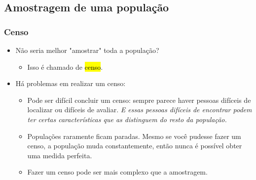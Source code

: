 \subsection{Amostragem de uma população}

\begin{frame}
\frametitle{Censo}

\begin{itemize}

\item Não seria melhor "amostrar" toda a população?

\begin{itemize}
\item Isso é chamado de \hl{censo}.
\end{itemize}

\pause

\item Há problemas em realizar um censo:

\begin{itemize}
\justifying
\item Pode ser difícil concluir um censo: sempre parece haver pessoas difíceis de localizar ou difíceis de avaliar. \textit{E essas pessoas difíceis de encontrar podem ter certas características que as distinguem do resto da população.}

\justifying
\item Populações raramente ficam paradas. Mesmo se você pudesse fazer um censo, a população muda constantemente, então nunca é possível obter uma medida perfeita.
\justifying
\item Fazer um censo pode ser mais complexo que a amostragem.
\end{itemize}

\end{itemize}

\end{frame}


